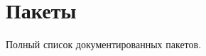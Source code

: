 \section{Пакеты}
Полный список документированных пакетов.\begin{DoxyCompactList}
\item{}
\end{DoxyCompactList}
